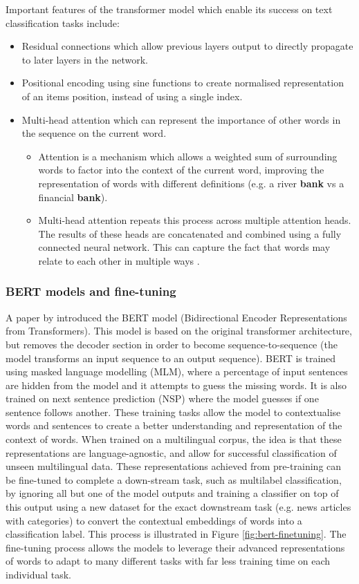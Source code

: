 \documentclass{l4proj}
\begin{document}
Important features of the transformer model which enable its success on text classification tasks include:
\begin{itemize}
    \item Residual connections which allow previous layers output to directly propagate to later layers in the network.
    \item Positional encoding using sine functions to create normalised representation of an items position, instead of using a single index.
    \item Multi-head attention which can represent the importance of other words in the sequence on the current word. 
    \begin{itemize}
        \item Attention is a mechanism which allows a weighted sum of surrounding words to factor into the context of the current word, improving the representation of words with different definitions (e.g. a river \textbf{bank} vs a financial \textbf{bank}).
        \item Multi-head attention repeats this process across multiple attention heads. The results of these heads are concatenated and combined using a fully connected neural network. This can capture the fact that words may relate to each other in multiple ways \citep{vaswani2017attention}.
    \end{itemize}
\end{itemize}

\subsubsection{BERT models and fine-tuning} \hfill \par
A paper by \cite{devlin2018bert} introduced the BERT model (Bidirectional Encoder Representations from Transformers). This model is based on the original transformer architecture, but removes the decoder section in order to become sequence-to-sequence (the model transforms an input sequence to an output sequence). BERT is trained using masked language modelling (MLM), where a percentage of input sentences are hidden from the model and it attempts to guess the missing words. It is also trained on next sentence prediction (NSP) where the model guesses if one sentence follows another. These training tasks allow the model to contextualise words and sentences to create a better understanding and representation of the context of words. When trained on a multilingual corpus, the idea is that these representations are language-agnostic, and allow for successful classification of unseen multilingual data. These representations achieved from pre-training can be fine-tuned to complete a down-stream task, such as multilabel classification, by ignoring all but one of the model outputs and training a classifier on top of this output using a new dataset for the exact downstream task (e.g. news articles with categories) to convert the contextual embeddings of words into a classification label. This process is illustrated in Figure \ref{fig:bert-finetuning}. The fine-tuning process allows the models to leverage their advanced representations of words to adapt to many different tasks with far less training time on each individual task.
\end{document}
